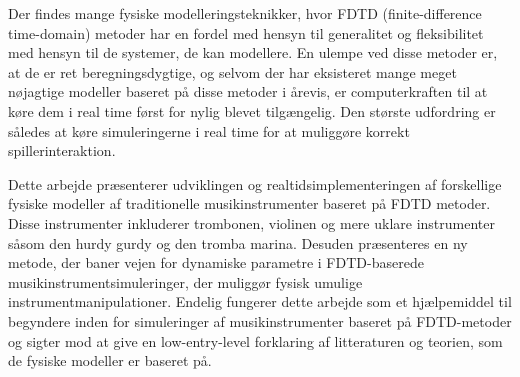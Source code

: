 Der findes mange fysiske modelleringsteknikker, hvor FDTD (finite-difference time-domain) metoder har en fordel med hensyn til generalitet og fleksibilitet med hensyn til de systemer, de kan modellere. En ulempe ved disse metoder er, at de er ret beregningsdygtige, og selvom der har eksisteret mange meget n{\o}jagtige modeller baseret på disse metoder i årevis, er computerkraften til at k{\o}re dem i real time f{\o}rst for nylig blevet tilg{\ae}ngelig. Den st{\o}rste udfordring er således at k{\o}re simuleringerne i real time for at muligg{\o}re korrekt spillerinteraktion.

Dette arbejde pr{\ae}senterer udviklingen og realtidsimplementeringen af forskellige fysiske modeller af traditionelle musikinstrumenter baseret på FDTD metoder. Disse instrumenter inkluderer trombonen, violinen og mere uklare instrumenter såsom den hurdy gurdy og den tromba marina. Desuden pr{\ae}senteres en ny metode, der baner vejen for dynamiske parametre i FDTD-baserede musikinstrumentsimuleringer, der muligg{\o}r fysisk umulige instrumentmanipulationer. Endelig fungerer dette arbejde som et hj{\ae}lpemiddel til begyndere inden for simuleringer af musikinstrumenter baseret på FDTD-metoder og sigter mod at give en low-entry-level forklaring af litteraturen og teorien, som de fysiske modeller er baseret på.